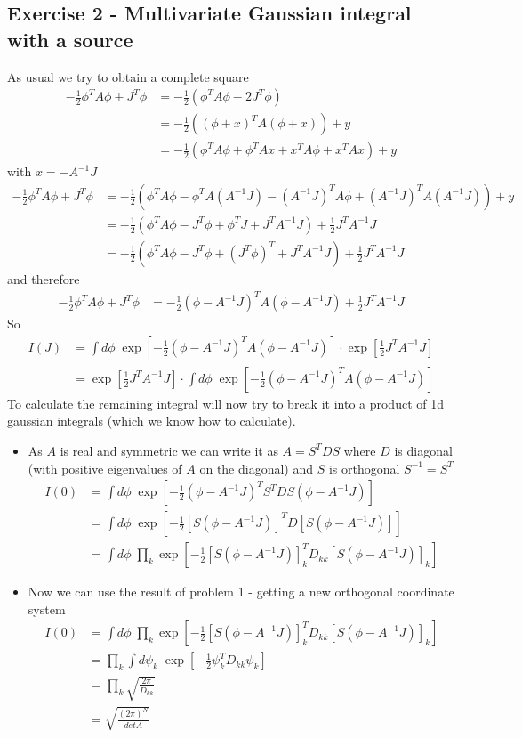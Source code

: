 \documentclass[10pt,a4paper]{article}
\theoremstyle{definition}
\begin{document}
\newpage
\subsection{Exercise 2 - Multivariate Gaussian integral with a source}
As usual we try to obtain a complete square
\begin{align}
-\frac{1}{2}\phi^TA\phi+J^T\phi
&=-\frac{1}{2}\left(\phi^TA\phi-2J^T\phi\right)\\
&=-\frac{1}{2}\left((\phi+x)^TA(\phi+x)\right)+y\\
&=-\frac{1}{2}\left(\phi^TA\phi+\phi^TAx+x^TA\phi+x^TAx\right)+y
\end{align}
with $x=-A^{-1}J$
\begin{align}
-\frac{1}{2}\phi^TA\phi+J^T\phi
&=-\frac{1}{2}\left(\phi^TA\phi-\phi^TA(A^{-1}J)-(A^{-1}J)^TA\phi+(A^{-1}J)^TA(A^{-1}J)\right)+y\\
&=-\frac{1}{2}\left(\phi^TA\phi-J^T\phi+\phi^TJ+J^TA^{-1}J\right)+\frac{1}{2}J^TA^{-1}J\\
&=-\frac{1}{2}\left(\phi^TA\phi-J^T\phi+(J^T\phi)^T+J^TA^{-1}J\right)+\frac{1}{2}J^TA^{-1}J\
\end{align}
and therefore
\begin{align}
-\frac{1}{2}\phi^TA\phi+J^T\phi
&=-\frac{1}{2}(\phi-A^{-1}J)^TA(\phi-A^{-1}J)+\frac{1}{2}J^TA^{-1}J
\end{align}
So
\begin{align}
I(J)&=\int d\phi\; \exp\left[-\frac{1}{2}(\phi-A^{-1}J)^TA(\phi-A^{-1}J)\right]\cdot\exp\left[\frac{1}{2}J^TA^{-1}J\right]\\
&=\exp\left[\frac{1}{2}J^TA^{-1}J\right]\cdot\int d\phi\; \exp\left[-\frac{1}{2}(\phi-A^{-1}J)^TA(\phi-A^{-1}J)\right]
\end{align}
To calculate the remaining integral will now try to break it into a product of 1d gaussian integrals (which we know how to calculate).
\begin{itemize}
\item As $A$ is real and symmetric we can write it as $A=S^TDS$ where $D$ is diagonal (with positive eigenvalues of $A$ on the diagonal) and $S$ is orthogonal $S^{-1}=S^T$
\begin{align}
I(0)
&=\int d\phi\; \exp\left[-\frac{1}{2}(\phi-A^{-1}J)^T S^TDS (\phi-A^{-1}J)\right]\\
&=\int d\phi\; \exp\left[-\frac{1}{2}[S(\phi-A^{-1}J)]^T D [S(\phi-A^{-1}J)]\right]\\
&=\int d\phi\; \prod_k\exp\left[-\frac{1}{2}[S(\phi-A^{-1}J)]_k^T D_{kk} [S(\phi-A^{-1}J)]_k\right]
\end{align}
\item Now we can use the result of problem 1 - getting a new orthogonal coordinate system
\begin{align}
I(0)
&=\int d\phi\; \prod_k\exp\left[-\frac{1}{2}[S(\phi-A^{-1}J)]_k^T D_{kk} [S(\phi-A^{-1}J)]_k\right]\\
&=\prod_k\int d\psi_k\; \exp\left[-\frac{1}{2}\psi_k^T D_{kk} \psi_k\right]\\
&=\prod_k\sqrt{\frac{2\pi}{D_{kk}}}\\
&=\sqrt{\frac{(2\pi)^N}{det A}}
\end{align}
\end{itemize} 
\end{document}
